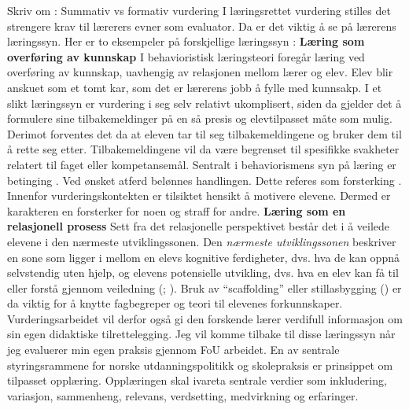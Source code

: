 \documentclass[main.tex]{subfiles}
\begin{document}
Skriv om : Summativ vs formativ vurdering
\newline
\newline
I læringsrettet vurdering stilles det strengere krav til lærerers evner som evaluator. Da er det viktig å se på lærerens læringssyn. 
Her er to eksempeler på forskjellige læringssyn :
\newline
\newline
\textbf{Læring som overføring av kunnskap}
\newline
I behavioristisk læringsteori foregår læring ved overføring av kunnskap, uavhengig av relasjonen mellom lærer 
og elev. Elev blir anskuet som et tomt kar, som det er lærerens jobb å fylle med kunnsakp. 
I et slikt læringssyn er vurdering i seg selv relativt ukomplisert, siden da gjelder det å 
formulere sine tilbakemeldinger på en så presis og elevtilpasset måte som mulig.
Derimot forventes det da at eleven tar til seg tilbakemeldingene og bruker dem til å rette seg etter.
Tilbakemeldingene vil da være begrenset til spesifikke svakheter relatert til faget eller kompetansemål.
Sentralt i behaviorismens syn på læring er betinging . Ved ønsket atferd belønnes 
handlingen. Dette referes som forsterking . Innenfor vurderingskontekten er
tilsiktet hensikt å motivere elevene. Dermed er karakteren en forsterker for noen og straff for andre.
\newline
\newline
\textbf{Læring som en relasjonell prosess}
\newline
Sett fra det relasjonelle perspektivet består det i å veilede elevene i den nærmeste utviklingssonen.
Den \emph{nærmeste utviklingssonen} beskriver en sone som ligger i mellom en elevs kognitive 
ferdigheter, dvs. hva de kan oppnå selvstendig uten hjelp, og elevens potensielle utvikling, dvs. 
hva en elev kan få til eller forstå gjennom veiledning (; ). 
Bruk av ``scaffolding'' eller stillasbygging () er da viktig for å knytte fagbegreper og teori til elevenes 
forkunnskaper. Vurderingsarbeidet vil derfor også gi den forskende lærer  verdifull informasjon om sin egen didaktiske tilrettelegging.
Jeg vil komme tilbake til disse læringssyn når jeg evaluerer min egen praksis gjennom FoU arbeidet.
\newline
\newline
En av sentrale styringsrammene for norske utdanningspolitikk og skolepraksis er prinsippet om tilpasset opplæring.
Opplæringen skal ivareta sentrale verdier som inkludering, variasjon, sammenheng, relevans, verdsetting, medvirkning og erfaringer.
\end{document}
